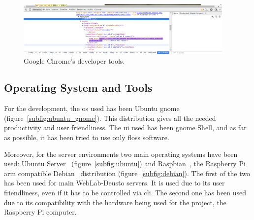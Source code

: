 \begin{figure}[!htbp]
	\centering
	\includegraphics[width=0.95\textwidth]{fig/chrome-dev}
	\caption{Google Chrome's developer tools.}
	\label{fig:chrome_dev}
\end{figure}

\subsection{Operating System and Tools}

For the development, the \acrlong{os} used has been Ubuntu \acrshort{gnome}~\cite{ubuntu_gnome_web}
(figure~\ref{subfig:ubuntu_gnome}). This distribution gives all the needed productivity and user
friendliness. The \acrlong{ui} used has been \acrshort{gnome} Shell, and as far as possible, it has
been tried to use only \acrshort{floss} software.

Moreover, for the server environments two main operating systems have been used: Ubuntu
Server~\cite{ubuntu_web} (figure~\ref{subfig:ubuntu}) and Raspbian~\cite{raspbian_web}, the
Raspberry Pi \acrshort{arm} compatible Debian~\cite{debian_web} distribution
(figure~\ref{subfig:debian}). The first of the two has been used for main WebLab-Deusto servers. It
is used due to its user friendliness, even if it has to be controlled via \acrshort{cli}. The second
one has been used due to its compatibility with the hardware being used for the project, the
Raspberry Pi computer.

